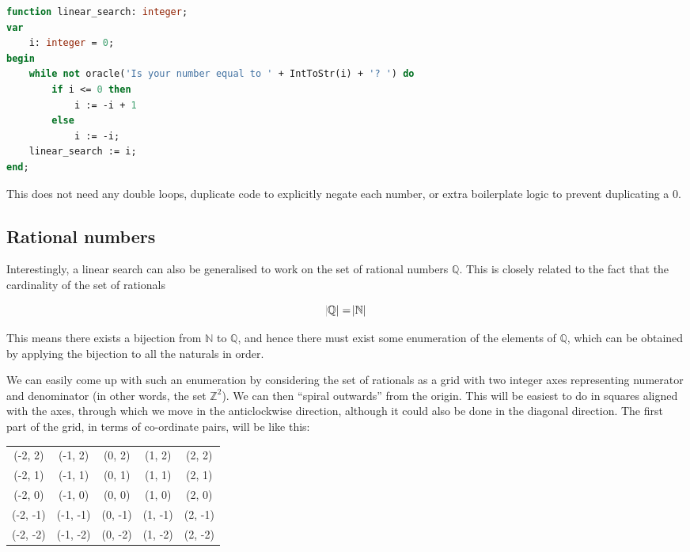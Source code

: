 \documentclass{article}
\begin{document}
\begin{lstlisting}[language=Pascal, caption=Linear search on $\mathbb{Z}$ implementation]
function linear_search: integer;
var
    i: integer = 0;
begin
    while not oracle('Is your number equal to ' + IntToStr(i) + '? ') do
        if i <= 0 then
            i := -i + 1
        else
            i := -i;
    linear_search := i;
end;
\end{lstlisting}

    This does not need any double loops, duplicate code to explicitly negate
    each number, or extra boilerplate logic to prevent duplicating a 0.

    \subsection{Rational numbers}

    Interestingly, a linear search can also be generalised to work on the set
    of rational numbers $\mathbb{Q}$. This is closely related to the fact that
    the cardinality of the set of rationals

    \begin{equation}
    \abs{\mathbb{Q}} = \abs{\mathbb{N}}
    \end{equation}

    This means there exists a bijection from $\mathbb{N}$ to $\mathbb{Q}$, and
    hence there must exist some enumeration of the elements of $\mathbb{Q}$,
    which can be obtained by applying the bijection to all the naturals in
    order.
    
    We can easily come up with such an enumeration by considering the set of
    rationals as a grid with two integer axes representing numerator and
    denominator (in other words, the set $\mathbb{Z}^2$). We can then ``spiral
    outwards'' from the origin. This will be easiest to do in squares aligned
    with the axes, through which we move in the anticlockwise direction,
    although it could also be done in the diagonal direction.  The first part
    of the grid, in terms of co-ordinate pairs, will be like this:

    \begin{center}
    \begin{tabular}{ c c c c c }
        (-2, 2) & (-1, 2) & (0, 2) & (1, 2) & (2, 2)\\
        (-2, 1) & (-1, 1) & (0, 1) & (1, 1) & (2, 1)\\
        (-2, 0) & (-1, 0) & (0, 0) & (1, 0) & (2, 0)\\
        (-2, -1) & (-1, -1) & (0, -1) & (1, -1) & (2, -1)\\
        (-2, -2) & (-1, -2) & (0, -2) & (1, -2) & (2, -2)\\
    \end{tabular}
    \end{center}
\end{document}
